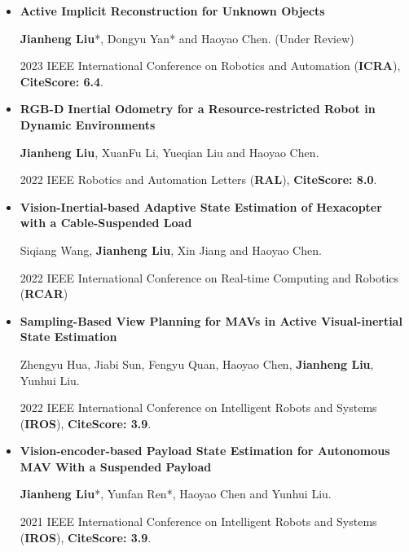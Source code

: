 \documentclass[11pt,a4paper,sans]{moderncv}        %
\begin{document}
{\begin{itemize}

    \item{\textbf{Active Implicit Reconstruction for Unknown Objects}

    \small{\textbf{Jianheng Liu}*, Dongyu Yan* and Haoyao Chen. (Under Review)}

    2023 IEEE International Conference on Robotics and Automation (\textbf{ICRA}), \textbf{CiteScore: 6.4}.
    }
    
    \vspace{3pt}

    \item{\textbf{RGB-D Inertial Odometry for a Resource-restricted Robot in Dynamic Environments}

    \small{\textbf{Jianheng Liu}, XuanFu Li, Yueqian Liu and Haoyao Chen.}
    
    2022 IEEE Robotics and Automation Letters (\textbf{RAL}), \textbf{CiteScore: 8.0}.
    }
    
    \vspace{3pt}

    \item{\textbf{Vision-Inertial-based Adaptive State Estimation of Hexacopter with a Cable-Suspended Load}

    \small{Siqiang Wang, \textbf{Jianheng Liu}, Xin Jiang and Haoyao Chen.
    }

    2022 IEEE International Conference on Real-time Computing and Robotics (\textbf{RCAR})
    }
    \vspace{3pt}



\item{\textbf{Sampling-Based View Planning for MAVs in Active Visual-inertial State Estimation}

\small{Zhengyu Hua, Jiabi Sun, Fengyu Quan, Haoyao Chen, \textbf{Jianheng Liu}, Yunhui Liu.}

2022 IEEE International Conference on Intelligent Robots and Systems (\textbf{IROS}), \textbf{CiteScore: 3.9}.
}

\vspace{3pt}

\item{\textbf{Vision-encoder-based Payload State Estimation for Autonomous MAV With a Suspended Payload}

\small{\textbf{Jianheng Liu}*, Yunfan Ren*, Haoyao Chen and Yunhui Liu. }

2021 IEEE International Conference on Intelligent Robots and Systems (\textbf{IROS}), \textbf{CiteScore: 3.9}.
}



\end{itemize}}
\end{document}

